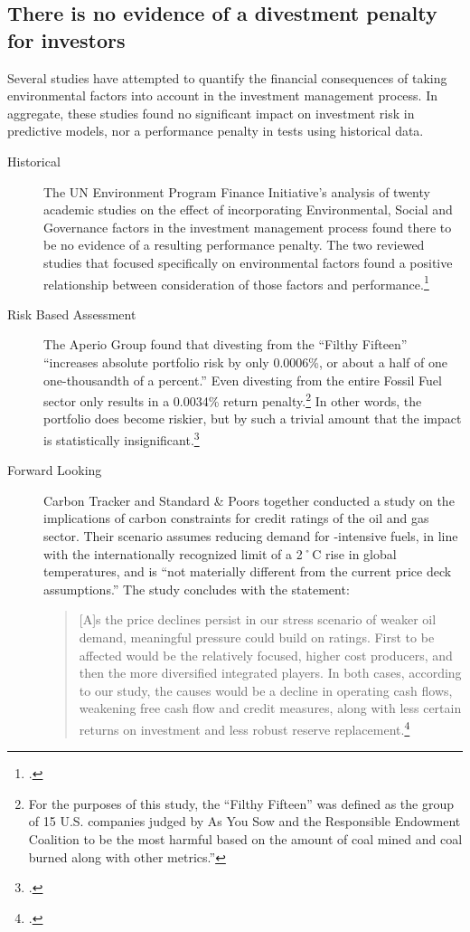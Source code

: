 \subsection {There is no evidence of a divestment penalty for investors}
\label{NoDivestPenalty}



Several studies have attempted to quantify the financial consequences of taking environmental factors into account in the investment management process.
In aggregate, these studies found no significant impact on investment risk in predictive models, nor a performance penalty in tests using historical data.
\begin{description}
  \item[Historical] The UN Environment Program Finance Initiative's analysis of twenty academic studies on the effect of incorporating Environmental, Social and Governance factors in the investment management process found there to be no evidence of a resulting performance penalty. The two reviewed studies that focused specifically on environmental factors found a positive relationship between consideration of those factors and performance.\footcite{UNEPFI2007}
  \item[Risk Based Assessment] The Aperio Group found that divesting from the ``Filthy Fifteen'' ``increases absolute portfolio risk by only 0.0006\%, or about a half of one one-thousandth of a percent.'' Even divesting from the entire Fossil Fuel sector only results in a 0.0034\% return penalty.\footnote{For the purposes of this study, the ``Filthy Fifteen'' was defined as the group of 15 U.S. companies judged by As You Sow and the Responsible Endowment Coalition to be the most harmful based on the amount of coal mined and coal burned along with other metrics.''} In other words, the portfolio does become riskier, but by such a trivial amount that the impact is statistically insignificant.\footcite{Aperio2013}
  \item[Forward Looking] Carbon Tracker and Standard \& Poors together conducted a study on the implications of carbon constraints for credit ratings of the oil and gas sector. Their scenario assumes reducing demand for -intensive fuels, in line with the internationally recognized limit of a 2˚C rise in global temperatures, and is ``not materially different from the current price deck assumptions.'' The study concludes with the statement:
\begin{quote} 
[A]s the price declines persist in our stress scenario of weaker oil demand, meaningful pressure could build on ratings. First to be affected would be the relatively focused, higher cost producers, and then the more diversified integrated players. In both cases, according to our study, the causes would be a decline in operating cash flows, weakening free cash flow and credit measures, along with less certain returns on investment and less robust reserve replacement.\footcite{SandPConstrained}

\end{quote}
\end{description}

